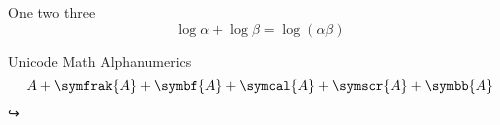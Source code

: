 \documentclass[a4paper]{article}
\begin{document}
One two three
\[
\log \alpha + \log \beta = \log(\alpha\beta)
\]

Unicode Math Alphanumerics
\[A + \symfrak{A}+\symbf{A}+ \symcal{A} + \symscr{A}+
\symbb{A}\]↪
\end{document}
